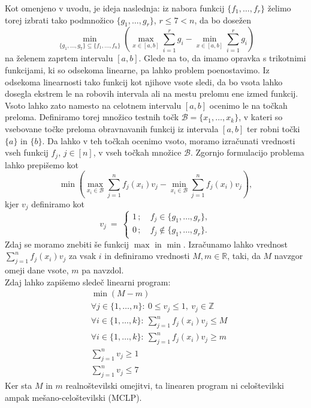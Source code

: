 \documentclass[11pt]{article}
\theoremstyle{definition}
\newcommand{\R}{\mathbb{R}}
\newcommand{\Z}{\mathbb{Z}}
\newcommand{\1}{\mathbbm{1}}
\newcommand{\set}[1]{\{#1\}}
\newcommand{\B}{\mathcal{B}}
\begin{document}
Kot omenjeno v uvodu, je ideja naslednja: iz nabora funkcij $\set{f_1,\ldots,f_r}$ želimo torej izbrati tako podmnožico $\set{g_1,\ldots,g_r}$, $r \leq 7 < n$, da bo dosežen
$$\min_{\set{g_1,\ldots,g_7} \subseteq \set{f_1,\ldots,f_n}}\left({\max_{x \in [a,b]}\sum_{i=1}^r g_i - \min_{x \in [a,b]}\sum_{i=1}^r g_i}\right)$$
na želenem zaprtem intervalu $[a,b]$. Glede na to, da imamo opravka s trikotnimi funkcijami, ki so odsekoma linearne, pa lahko problem poenostavimo. Iz odsekoma linearnosti tako funkcij kot njihove vsote sledi, da bo vsota lahko dosegla ekstrem le na robovih intervala ali na mestu prelomu ene izmed funkcij. Vsoto lahko zato namesto na celotnem intervalu $[a,b]$ ocenimo le na točkah preloma. Definiramo torej množico testnih točk $\mathcal{B} = \set{x_1,\ldots,x_k}$, v kateri so vsebovane točke preloma obravnavanih funkcij iz intervala $[a,b]$ ter robni točki $\set{a}$ in $\set{b}$. Da lahko v teh točkah ocenimo vsoto, moramo izračunati vrednosti vseh funkcij $f_j$, $j \in [n]$, v vseh točkah množice $\B$. Zgornjo formulacijo problema lahko prepišemo kot
$$\min \left( \max_{x_i \in \B} \sum_{j=1}^n f_j(x_i)v_j - \min_{x_i \in \mathcal{B}} \sum_{j=1}^n f_j(x_i)v_j \right),$$
kjer $v_j$ definiramo kot
$$v_j ~=~ \begin{cases}
1\,; ~&f_j \in \set{g_1,\ldots,g_r}, \\
0\,; ~&f_j \notin \set{g_1,\ldots,g_r}.
\end{cases}$$
Zdaj se moramo znebiti še funkcij $\max$ in $\min$. Izračunamo lahko vrednost $\sum_{j=1}^n f_j(x_i)v_j$ za vsak $i$ in definiramo vrednosti $M,m \in \R$, taki, da $M$ navzgor omeji dane vsote, $m$ pa navzdol.\\

Zdaj lahko zapišemo sledeč linearni program:
\begin{align*}
&\min(M-m) \\
&\forall j \in \set{1,\ldots,n}: ~0 \leq v_j \leq 1, ~v_j \in \Z \\
&\forall i \in \set{1,\ldots,k}: ~\sum_{j=1}^n f_j(x_i)v_j \leq M \\
&\forall i \in \set{1,\ldots,k}: ~\sum_{j=1}^n f_j(x_i)v_j \geq m \\
&\sum_{j=1}^n v_j \geq 1 \\
&\sum_{j=1}^n v_j \leq 7
\end{align*}
Ker sta $M$ in $m$ realnoštevilski omejitvi, ta linearen program ni celoštevilski ampak mešano-celoštevilski (MCLP).

\end{document}
